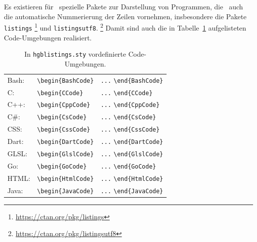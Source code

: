 Es existieren für \latex\ spezielle Pakete zur Darstellung von Programmen,
die \ua\ auch die automatische Nummerierung der Zeilen vornehmen,
insbesondere die Pakete \texttt{listings}%
\footnote{\url{https://ctan.org/pkg/listings}}
und \texttt{listingsutf8}.%
\footnote{\url{https://ctan.org/pkg/listingsutf8}}
Damit sind auch die in Tabelle~\ref{tab:CodeUmgebungen} aufgelisteten
Code-Umgebungen realisiert.
%
\begin{table}
\caption{In \nolinkurl{hgblistings.sty} vordefinierte Code-Umgebungen.}
\label{tab:CodeUmgebungen}
\centering
\begin{tabular}{@{}lll@{}}
	\toprule
	Bash:        & \verb!\begin{BashCode}!
		& \verb!...! \verb!\end{BashCode}! \\
	C:           & \verb!\begin{CCode}!
		& \verb!...! \verb!\end{CCode}! \\
	C++:         & \verb!\begin{CppCode}!
		& \verb!...! \verb!\end{CppCode}! \\
	C\#:         & \verb!\begin{CsCode}!
		& \verb!...! \verb!\end{CsCode}! \\
	CSS:         & \verb!\begin{CssCode}!
		& \verb!...! \verb!\end{CssCode}! \\
	Dart:        & \verb!\begin{DartCode}!
		& \verb!...! \verb!\end{DartCode}! \\
	GLSL:        & \verb!\begin{GlslCode}!
		& \verb!...! \verb!\end{GlslCode}! \\
	Go:          & \verb!\begin{GoCode}!
		& \verb!...! \verb!\end{GoCode}! \\
	HTML:        & \verb!\begin{HtmlCode}!
		& \verb!...! \verb!\end{HtmlCode}! \\
	Java:        & \verb!\begin{JavaCode}!
		& \verb!...! \verb!\end{JavaCode}! \\

\end{tabular}
\end{table}
